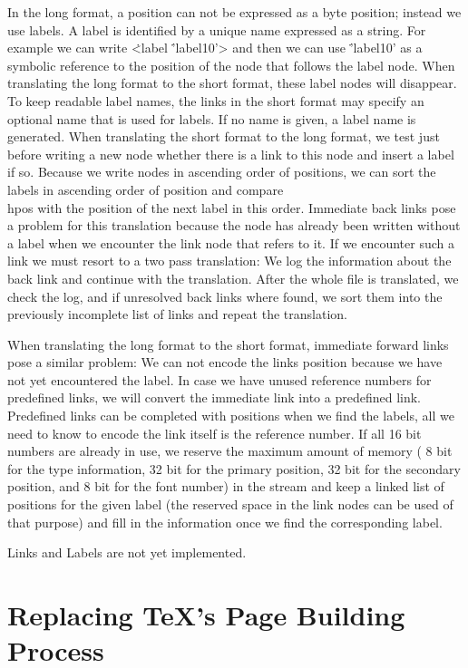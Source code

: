In the long format, a position can not be expressed as a byte
position; instead we use labels.  A label is identified by a unique
name expressed as a string. For example we can write
\.{<label} \.{'label10'>} and then we can use \.{'label10'} as a
symbolic reference to the position of the node
that follows the label node. When translating the long format to the
short format, these label nodes will disappear. To keep readable label
names, the links in the short format may specify an optional name that
is used for labels. If no name is given, a label name is
generated. When translating the short format to the long format, we
test just before writing a new node whether there is a link to this
node and insert a label if so. Because we write nodes in ascending
order of positions, we can sort the labels in ascending order of
position and compare \\{hpos} with the position of the next label in
this order.  Immediate back links pose a problem for this translation
because the node has already been written without a label when we
encounter the link node that refers to it. If we encounter such a link
we must resort to a two pass translation: We log the information
about the back link and continue with the translation.  After the
whole file is translated, we check the log, and if unresolved back
links where found, we sort them into the previously incomplete list of
links and repeat the translation.

When translating the long format to the short format, immediate
forward links pose a similar problem: We can not encode the links
position because we have not yet encountered the label. In case we
have unused reference numbers for predefined links, we will convert the immediate link into a
predefined link. Predefined links can be completed with positions when
we find the labels, all we need to know to encode the link itself is the
reference number. If all 16 bit numbers are already in use, we reserve
the maximum amount of memory ( 8 bit for the type information,
32 bit for the primary position, 32 bit for the secondary position,
and 8 bit for the font number) in the stream and keep a linked list of
positions for the given label (the reserved space in the link nodes
can be used of that purpose) and fill in the information once we find
the corresponding label.

Links and Labels are not yet implemented.

\section{Replacing \TeX's Page Building Process}


